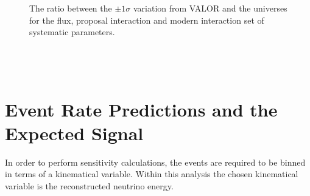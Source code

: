 \begin{figure}[h!]
    \vspace{0.1\textwidth}
  \captionsetup{width=0.45\textwidth}
  \parbox[b]{0.45\textwidth}%
  {
   \caption[The ratio between the $\pm 1 \sigma$ variation from VALOR. and the universes for the flux, proposal interaction and modern interaction set of systematics.]{The ratio between the $\pm 1 \sigma$ variation from VALOR and the universes for the flux, proposal interaction and modern interaction set of systematic parameters.  \\\phantom{.}\\\phantom{.}\\\phantom{.}\\
   \label{fig:1sigma_variations_toys}}
  }
\end{figure}

\clearpage


\clearpage
\section{Event Rate Predictions and the Expected Signal}

In order to perform sensitivity calculations, the events are required to be binned in terms of a kinematical variable. Within this analysis the chosen kinematical variable is the reconstructed neutrino energy. 

